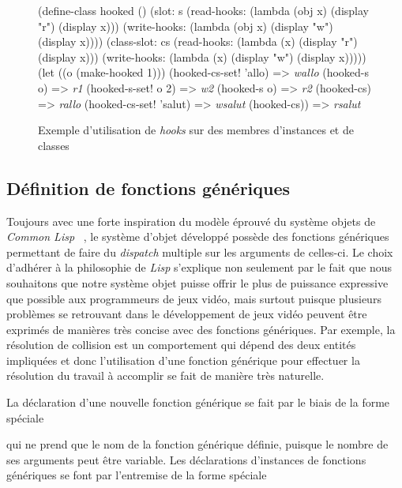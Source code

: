 \documentclass[12pt,twoside,letterpaper,francais]{book}
\newcommand{\lisp}{{\textit{Lisp }}}
\newcommand{\clisp}{{\textit{Common Lisp }}}
\newcommand{\scheme}[1]{\selectlanguage{english}{\tt #1}\selectlanguage{french}}
\newcommand{\schemeresult}[1]{{\it #1}}
\begin{document}
\begin{figure}[h!]
  \begin{schemecode}
(define-class hooked ()
  (slot: s
    (read-hooks:  (lambda (obj x) (display "r") (display x)))
    (write-hooks: (lambda (obj x) (display "w") (display x))))
  (class-slot: cs
    (read-hooks:  (lambda (x) (display "r") (display x)))
    (write-hooks: (lambda (x) (display "w") (display x)))))
(let ((o (make-hooked 1))) 
  (hooked-cs-set! 'allo)   => \schemeresult{wallo}
  (hooked-s o)             => \schemeresult{r1}
  (hooked-s-set! o 2)      => \schemeresult{w2}
  (hooked-s o)             => \schemeresult{r2}
  (hooked-cs)              => \schemeresult{rallo}
  (hooked-cs-set! 'salut)  => \schemeresult{wsalut}
  (hooked-cs))             => \schemeresult{rsalut}
  \end{schemecode}
  \caption{Exemple d'utilisation de \textit{hooks} sur des membres
    d'instances et de classes}
  \label{OO:hooks}
\end{figure}


\FloatBarrier
\subsection{Définition de fonctions génériques} \label{OO:genfun}
Toujours avec une forte inspiration du modèle éprouvé du système
objets de \clisp~\cite{CLOS}, le système d'objet développé possède des
fonctions génériques permettant de faire du \textit{dispatch} multiple
sur les arguments de celles-ci. Le choix d'adhérer à la philosophie de
\lisp s'explique non seulement par le fait que nous souhaitons que
notre système objet puisse offrir le plus de puissance expressive que
possible aux programmeurs de jeux vidéo, mais surtout puisque
plusieurs problèmes se retrouvant dans le développement de jeux vidéo
peuvent être exprimés de manières très concise avec des fonctions
génériques. Par exemple, la résolution de collision est un
comportement qui dépend des deux entités impliquées et donc
l'utilisation d'une fonction générique pour effectuer la résolution du
travail à accomplir se fait de manière très naturelle.

La déclaration d'une nouvelle fonction générique se fait par le biais
de la forme spéciale

 \scheme{(define-generic <gen-fun-name>)} 

\noindent
qui ne prend que le nom de la fonction générique définie, puisque le
nombre de ses arguments peut être variable. Les déclarations
d'instances de fonctions génériques se font par l'entremise de la
forme spéciale
\end{document}
